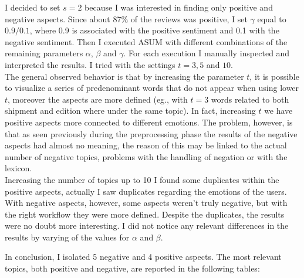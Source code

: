 \documentclass[a4paper,12pt]{article}
\begin{document}
\noindent I decided to set $s=2$ because I was interested in finding only positive and negative aspects. Since about 87\% of the reviews was positive, I set $\gamma$ equal to $0.9/0.1$, where 0.9 is associated with the positive sentiment and 0.1 with the negative sentiment. Then I executed ASUM with different combinations of the remaining parameters $\alpha$, $\beta$ and $\gamma$. For each execution I manually inspected and interpreted the results. I tried with the settings $t=3, 5$ and $10$. \\

\noindent The general observed behavior is that by increasing the parameter $t$, it is possible to visualize a series of predenominant words that do not appear when using lower $t$, moreover the aspects are more defined (eg.,  with $t = 3$ words related to both shipment and edition where under the same topic). In fact, increasing $t$ we have positive aspects more connected to different emotions. The problem, however, is that as seen previously during the preprocessing phase the results of the negative aspects had almost no meaning, the reason of this may be linked to the actual number of negative topics, problems with the handling of negation or with the lexicon. \\

\noindent Increasing the number of topics up to 10 I found some duplicates within the positive aspects, actually I saw duplicates regarding the emotions of the users. With negative aspects, however, some aspects weren't truly negative, but with the right workflow they were more defined. Despite the duplicates, the results were no doubt more interesting. I did not notice any relevant differences in the results by varying of the values for $\alpha$ and $\beta$. 

\noindent In conclusion, I isolated 5 negative and 4 positive aspects. The most relevant topics, both positive and negative, are reported in the following tables:  
\end{document}
